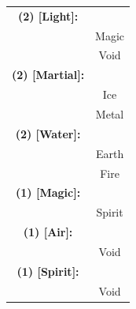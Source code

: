 \begin{table}[H]
\begin{tabular}{>{\bfseries}c c}
	(2) [Light]:&\\
	& Magic \\
	& Void \\

	(2) [Martial]:&\\
	& Ice \\
	& Metal \\

	(2) [Water]:&\\
	& Earth \\
	& Fire \\

	(1) [Magic]:&\\
	& Spirit \\

	(1) [Air]:&\\
	& Void \\

	(1) [Spirit]:&\\
	& Void \\

\end{tabular}
\end{table}


